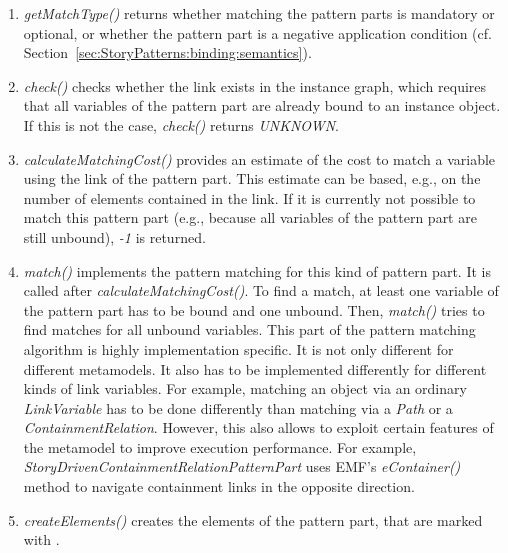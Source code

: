 \begin{enumerate}
	\item \emph{getMatchType()} returns whether matching the pattern parts is mandatory or optional, or whether the pattern part is a negative application condition (cf. Section~\ref{sec:StoryPatterns:binding:semantics}). 
	
	\item \emph{check()} checks whether the link exists in the instance graph, which requires that all variables of the pattern part are already bound to an instance object. 
	If this is not the case, \emph{check()} returns \emph{UNKNOWN}. 

	\item \emph{calculateMatchingCost()} provides an estimate of the cost to match a variable using the link of the pattern part. 
	This estimate can be based, e.g., on the number of elements contained in the link.
	If it is currently not possible to match this pattern part (e.g., because all variables of the pattern part are still unbound), \emph{-1} is returned.

	\item \emph{match()} implements the pattern matching for this kind of pattern part. 
	It is called after \emph{calculateMatchingCost()}. 
	To find a match, at least one variable of the pattern part has to be bound and one unbound. 
	Then, \emph{match()} tries to find matches for all unbound variables. 
	This part of the pattern matching algorithm is highly implementation specific. 
	It is not only different for different metamodels. 
	It also has to be implemented differently for different kinds of link variables.
	For example, matching an object via an ordinary \emph{LinkVariable} has to be done differently than matching via a \emph{Path} or a \emph{ContainmentRelation}.
	However, this also allows to exploit certain features of the metamodel to improve execution performance. 
	For example, \emph{StoryDrivenContainmentRelationPatternPart} uses EMF's \emph{eContainer()} method to navigate containment links in the opposite direction.	
	
	\item \emph{createElements()} creates the elements of the pattern part, that are marked with \create.
	

\end{enumerate}
